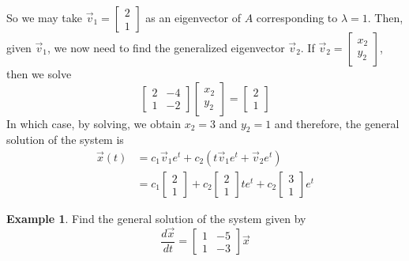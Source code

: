 \documentclass[11pt]{book}
\theoremstyle{definition}\newtheorem{definition}[subsection]{Definition}
\theoremstyle{definition}\newtheorem{example}[subsection]{Example}
\theoremstyle{definition}\newtheorem{notation}[subsection]{Notation}
\theoremstyle{definition}\newtheorem{remark}[subsection]{Remark}
\theoremstyle{theorem}\newtheorem{theorem}[subsection]{Theorem}
\theoremstyle{theorem}\newtheorem{lemma}[subsection]{Lemma}
\theoremstyle{theorem}\newtheorem{proposition}[subsection]{Proposition}
\theoremstyle{theorem}\newtheorem{corollary}[subsection]{Corollary}
\theoremstyle{theorem}\newtheorem{case}{Case}
\theoremstyle{remark}\newtheorem{subcase}{Subcase}[case]
\begin{document}
So we may take $\vec{v}_1 = \begin{bmatrix} 2 \\ 1 \end{bmatrix}$ as an eigenvector of $A$ corresponding to $\lambda = 1$. Then, given $\vec{v}_1$, we now need to find the generalized eigenvector $\vec{v}_2$. If $\vec{v}_2 = \begin{bmatrix} x_2 \\ y_2 \end{bmatrix}$, then we solve
\begin{equation*}
    \begin{bmatrix} 2 & -4 \\ 1 & -2 \end{bmatrix} \begin{bmatrix} x_2 \\ y_2 \end{bmatrix} = \begin{bmatrix} 2 \\ 1 \end{bmatrix}
\end{equation*}
In which case, by solving, we obtain $x_2 = 3$ and $y_2 = 1$ and therefore, the general solution of the system is
\begin{align*}
    \vec{x}(t) &= c_1\vec{v}_1e^t + c_2(t\vec{v}_1e^t + \vec{v}_2e^t) \\
    &= c_1\begin{bmatrix} 2 \\ 1 \end{bmatrix} + c_2 \begin{bmatrix} 2 \\ 1 \end{bmatrix} te^t + c_2 \begin{bmatrix} 3 \\ 1 \end{bmatrix} e^t
\end{align*}

\begin{example}\label{example:1.2.6}
    Find the general solution of the system given by
    \begin{equation*}
        \frac{d\vec{x}}{dt} = \begin{bmatrix} 1 & -5 \\ 1 & -3 \end{bmatrix}\vec{x}
    \end{equation*}
\end{example}
\end{document}
